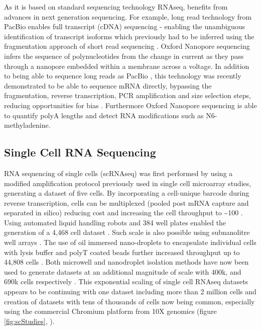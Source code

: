 As it is based on standard sequencing technology RNAseq, benefits from advances in next generation sequencing.
For example, long read technology from PacBio enables full transcript (cDNA) sequencing - enabling the unambiguous identification of transcript isoforms which previously had to be inferred using the fragmentation approach of short read sequencing \parencite{Sharon2013singlemolecule, Cartolano2016cDNA}.
Oxford Nanopore sequencing infers the sequence of polynucleotides from the change in current as they pass through a nanopore embedded within a membrane across a voltage.
In addition to being able to sequence long reads as PacBio \parencite{Oikonomopoulos2016Benchmarking}, this technology was recently demonstrated to be able to sequence mRNA directly, bypassing the fragmentation, reverse transcription, PCR amplification and size selection steps, reducing opportunities for bias \parencite{Garalde2018Highly, Workman2019Nanopore}.
Furthermore Oxford Nanopore sequencing is able to quantify polyA lengths and detect RNA modifications such as N6-methyladenine.

\subsection{Single Cell RNA Sequencing}
RNA sequencing of single cells (scRNAseq) was first performed by \cite{Tang2009mRNASeq} using a modified amplification protocol previously used in single cell microarray studies, generating a dataset of five cells.
By incorporating a cell-unique barcode during reverse transcription, cells can be multiplexed (pooled post mRNA capture and separated in silico) reducing cost and increasing the cell throughput to \textasciitilde100 \parencite{Islam2012Highly}.
Using automated liquid handling robots and 384 well plates enabled the generation of a 4,468 cell dataset \parencite{Jaitin2014Massively}.
Such scale is also possible using subnanolitre well arrays \parencite{Bose2015Scalable, Fan2015Combinatorial, Gierahn2017SeqWell}.
The use of oil immersed nano-droplets to encapsulate individual cells with lysis buffer and polyT coated beads further increased throughput up to 44,808 cells \parencite{Macosko2015Highly, Klein2015Droplet}.
Both microwell and nanodroplet isolation methods have now been used to generate datasets at an additional magnitude of scale with 400k, and 690k cells respectively \parencite{Saunders2018Molecular, Han2018Mapping}.
This exponential scaling of single cell RNAseq datasets appears to be continuing with one dataset including more than 2 million cells \parencite{Cao2019singlecell} and creation of datasets with tens of thousands of cells now being common, especially using the commercial Chromium platform from 10X genomics (figure \ref{fig:scStudies}, \cite{Zheng2017Massively, Svensson2018Exponential}).

